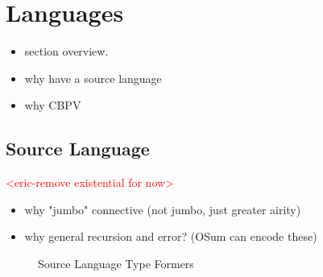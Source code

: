 \documentclass[acmsmall]{acmart}
\newcommand{\eric}[1]{\textcolor{red}{ <eric-#1> }}
\begin{document}
\section{Languages}\label{sec:Languages}
\begin{itemize}
  \item section overview.
  \item why have a source language
  \item why CBPV
\end{itemize}
\subsection{Source Language}\label{sec:SourceLang}
\eric{remove existential for now}
\begin{itemize}
  \item why "jumbo" connective (not jumbo, just greater airity)
  \item why general recursion and error? (OSum can encode these)
\end{itemize}
\begin{figure}[H]
  \caption{Source Language Type Formers}
  \label{fig:value-type-formers}
\end{figure}
\end{document}
